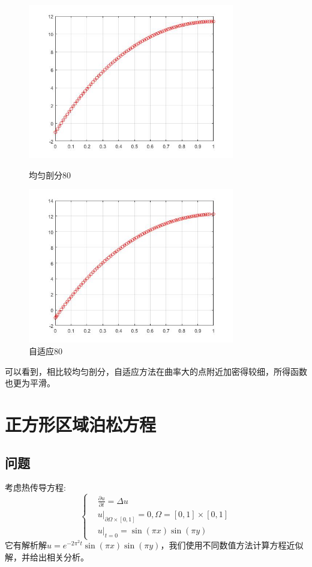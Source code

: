 \documentclass[12pt]{ctexart}
\begin{document}
\begin{figure}[H]
	\centering
	\begin{minipage}[t]{0.48\textwidth}
		\centering
		\includegraphics[width=9cm]{方程三，均匀剖分80.jpg}
		\caption{均匀剖分80}
	\end{minipage}
	\begin{minipage}[t]{0.48\textwidth}
		\centering
		\includegraphics[width=9cm]{方程三，自适应80.jpg}
		\caption{自适应80}
	\end{minipage}
\end{figure}
可以看到，相比较均匀剖分，自适应方法在曲率大的点附近加密得较细，所得函数也更为平滑。
\section{正方形区域泊松方程}
\subsection{问题}
考虑热传导方程:
$$
\left\{
\begin{aligned}
&\frac{\partial u}{\partial t} = \Delta u\\
&u|_{\partial \Omega\times[0,1]} = 0, \Omega = [0,1]\times [0,1]\\
&u|_{t=0}=\sin(\pi x)\sin(\pi y)
\end{aligned}
\right.
$$
它有解析解$u = e^{-2\pi^2t}\sin(\pi x)\sin(\pi y)$，我们使用不同数值方法计算方程近似解，并给出相关分析。
\end{document}
